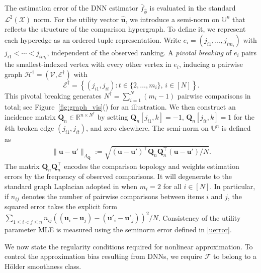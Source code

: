 \documentclass[
  12pt]{article}
\begin{document}
The estimation error of the DNN estimator $\bar{f}_{\widehat{\phi}}$ is evaluated in the standard $\mathcal{L}^2(\mathcal{X})$ norm. For the utility vector $\widehat{\boldsymbol{u}}$, we introduce a semi-norm on $\mathbb{U}^n$ that reflects the structure of the comparison hypergraph. To define it, we represent each hyperedge as an ordered tuple representation. Write $e_i = (j_{i1},\ldots,j_{im_i})$ with $j_{i1}<\cdots<j_{im_i}$, independent of the observed ranking. A \emph{pivotal breaking} of $e_i$ pairs the smallest-indexed vertex with every other vertex in $e_i$, inducing a pairwise graph $\mathcal{H}^\dagger = (\mathcal{V},\mathcal{E}^\dagger)$ with
$$\mathcal{E}^{\dagger} = \left\{(j_{i 1}, j_{i t}) : t \in \{2, \dots, m_i\}, \, i \in [N] \right\}.$$
This pivotal breaking generates $N^\dagger = \sum_{i=1}^N(m_i-1)$ pairwise comparisons in total; see Figure~\ref{fig:graph_vis}() for an illustration. We then construct an incidence matrix $\boldsymbol{Q}_n\in\mathbb{R}^{n\times N^\dagger}$ by setting $\boldsymbol{Q}_n[j_{i1},k]=-1$, $\boldsymbol{Q}_n[j_{it},k]=1$ for the $k$th broken edge $(j_{i1},j_{it})$, and zero elsewhere. The semi-norm on $\mathbb{U}^n$ is defined as
\begin{align}\label{uerror}
    \|\boldsymbol{u}-\boldsymbol{u}'\|_{\Lambda_{\boldsymbol{Q}}} := \sqrt{(\boldsymbol{u}-\boldsymbol{u}')^\top\boldsymbol{Q}_n\boldsymbol{Q}_n^\top(\boldsymbol{u}-\boldsymbol{u}')/N}.
\end{align}
The matrix $\boldsymbol{Q}_n\boldsymbol{Q}_n^\top$ encodes the comparison topology and weights estimation errors by the frequency of observed comparisons. It will degenerate to the standard graph Laplacian adopted in \cite{shah2016estimation} when $m_i=2$ for all $i\in[N]$. In particular, if $n_{ij}$ denotes the number of pairwise comparisons between items $i$ and $j$, the squared error takes the explicit form $\sum_{1 \leq i < j \leq n}n_{i j} ( (\boldsymbol{u}_i - \boldsymbol{u}_j) - (\boldsymbol{u}'_i - \boldsymbol{u}'_j) )^2/N$.
Consistency of the utility parameter MLE is measured using the seminorm error defined in \eqref{uerror}.

We now state the regularity conditions required for nonlinear approximation. To control the approximation bias resulting from DNNs, we require $\mathcal{F}$ to belong to a H\"older smoothness class.
\end{document}
